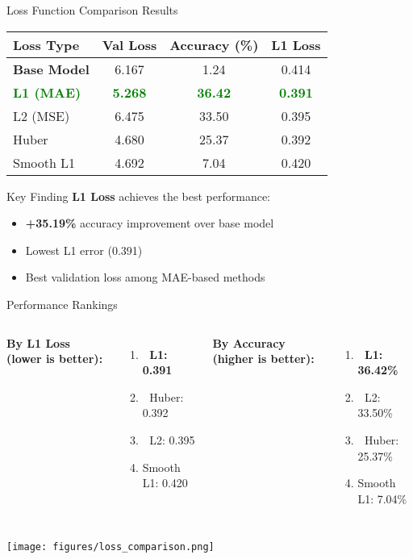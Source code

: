 \documentclass[aspectratio=169]{beamer}
\begin{document}
\begin{frame}{Loss Function Comparison Results}
\begin{table}
\centering
\begin{tabular}{lccc}
\toprule
\textbf{Loss Type} & \textbf{Val Loss} & \textbf{Accuracy (\%)} & \textbf{L1 Loss} \\
\midrule
\textbf{Base Model} & 6.167 & 1.24 & 0.414 \\
\midrule
\textcolor{green}{\textbf{L1 (MAE)}} & \textcolor{green}{\textbf{5.268}} & \textcolor{green}{\textbf{36.42}} & \textcolor{green}{\textbf{0.391}} \\
L2 (MSE) & 6.475 & 33.50 & 0.395 \\
Huber & 4.680 & 25.37 & 0.392 \\
Smooth L1 & 4.692 & 7.04 & 0.420 \\
\bottomrule
\end{tabular}
\end{table}

\vspace{0.3cm}
\begin{block}{Key Finding}
\textbf{L1 Loss} achieves the best performance:
\begin{itemize}
    \item \textbf{+35.19\%} accuracy improvement over base model
    \item Lowest L1 error (0.391)
    \item Best validation loss among MAE-based methods
\end{itemize}
\end{block}
\end{frame}

\begin{frame}{Performance Rankings}
\begin{columns}
\textbf{By L1 Loss (lower is better):}
\begin{enumerate}
    \item 🥇 \textbf{L1: 0.391}
    \item 🥈 Huber: 0.392
    \item 🥉 L2: 0.395
    \item Smooth L1: 0.420
\end{enumerate}

\textbf{By Accuracy (higher is better):}
\begin{enumerate}
    \item 🥇 \textbf{L1: 36.42\%}
    \item 🥈 L2: 33.50\%
    \item 🥉 Huber: 25.37\%
    \item Smooth L1: 7.04\%
\end{enumerate}
\end{columns}

\vspace{1cm}
\begin{center}
\texttt{[image: figures/loss\_comparison.png]}
\end{center}
\end{frame}
\end{document}
